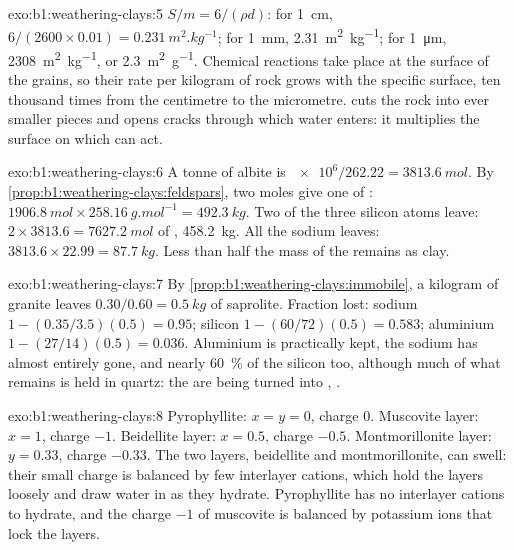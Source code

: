 \begin{solution}{exo:b1:weathering-clays:5}
$S/m = 6/(\rho d)$: for \qty{1}{cm}, $6/(2600\times0.01) =
\qty{0.231}{m^2.kg^{-1}}$; for \qty{1}{mm}, \qty{2.31}{m^2.kg^{-1}}; for
\qty{1}{\micro m}, \qty{2308}{m^2.kg^{-1}}, or \qty{2.3}{m^2.g^{-1}}.
Chemical reactions take place at the surface of the grains, so their rate per
kilogram of rock grows with the specific surface, ten thousand times from the
centimetre to the micrometre.  cuts the rock into ever
smaller pieces and opens cracks through which water enters: it multiplies the
surface on which  can act.
\end{solution}

\begin{solution}{exo:b1:weathering-clays:6}
A tonne of albite is $\num{e6}/262.22 = \qty{3813.6}{mol}$. By
\cref{prop:b1:weathering-clays:feldspars}, two moles give one of :
$\qty{1906.8}{mol} \times \qty{258.16}{g.mol^{-1}} = \qty{492.3}{kg}$. Two of
the three silicon atoms leave: $2\times3813.6 = \qty{7627.2}{mol}$ of
, \qty{458.2}{kg}. All the sodium leaves: $3813.6\times22.99 =
\qty{87.7}{kg}$. Less than half the mass of the  remains as clay.
\end{solution}

\begin{solution}{exo:b1:weathering-clays:7}
By \cref{prop:b1:weathering-clays:immobile}, a kilogram of granite leaves
$0.30/0.60 = \qty{0.5}{kg}$ of saprolite. Fraction lost: sodium $1 -
(0.35/3.5)(0.5) = 0.95$; silicon $1 - (60/72)(0.5) = 0.583$; aluminium $1 -
(27/14)(0.5) = 0.036$. Aluminium is practically kept, the sodium has almost
entirely gone, and nearly \qty{60}{\percent} of the silicon too, although much of what
remains is held in quartz: the  are being turned into ,
.
\end{solution}

\begin{solution}{exo:b1:weathering-clays:8}
Pyrophyllite: $x = y = 0$, charge 0. Muscovite layer: $x = 1$, charge $-1$.
Beidellite layer: $x = 0.5$, charge $-0.5$. Montmorillonite layer: $y = 0.33$,
charge $-0.33$. The two  layers, beidellite and montmorillonite, can
swell: their small charge is balanced by few interlayer cations, which hold the
layers loosely and draw water in as they hydrate. Pyrophyllite has no
interlayer cations to hydrate, and the charge $-1$ of muscovite is balanced by
potassium ions that lock the layers.
\end{solution}

